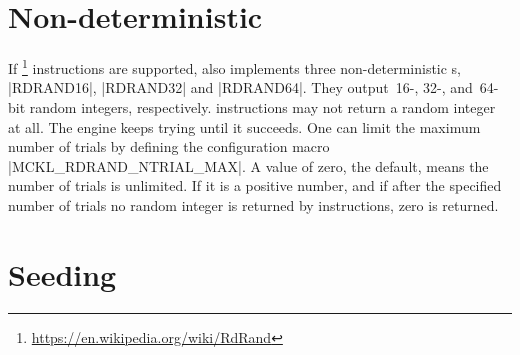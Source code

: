\section{Non-deterministic \texorpdfstring{\rng}{RNG}}
\label{sec:Non-deterministic RNG}

If \rdrand\footnote{\url{https://en.wikipedia.org/wiki/RdRand}} instructions
are supported, \mckl also implements three non-deterministic \rng{}s,
|RDRAND16|, |RDRAND32| and |RDRAND64|. They output~16-, 32-, and~64-bit random
integers, respectively. \rdrand instructions may not return a random integer at
all. The \rng engine keeps trying until it succeeds. One can limit the maximum
number of trials by defining the configuration macro |MCKL_RDRAND_NTRIAL_MAX|.
A value of zero, the default, means the number of trials is unlimited. If it is
a positive number, and if after the specified number of trials no random
integer is returned by \rdrand instructions, zero is returned.

\section{Seeding \texorpdfstring{\rng}{RNG}}
\label{sec:Seeding RNG}

